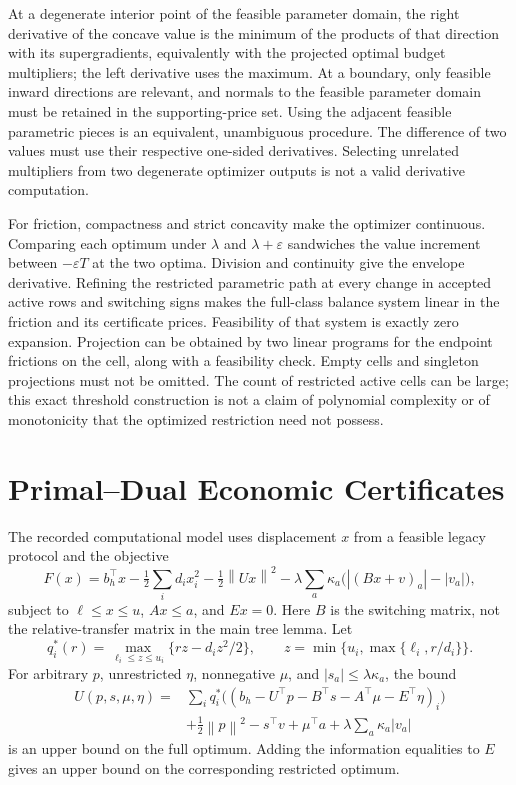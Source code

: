 \documentclass[11pt,letterpaper]{article}
\theoremstyle{definition}\newtheorem{remark}[theorem]{Remark}
\newcommand{\norm}[1]{\left\lVert#1\right\rVert}\newcommand{\argmax}{\operatorname*{arg\,max}}
\begin{document}
At a degenerate interior point of the feasible parameter domain, the right derivative of the concave value is the minimum of the products of that direction with its supergradients, equivalently with the projected optimal budget multipliers; the left derivative uses the maximum. At a boundary, only feasible inward directions are relevant, and normals to the feasible parameter domain must be retained in the supporting-price set. Using the adjacent feasible parametric pieces is an equivalent, unambiguous procedure. The difference of two values must use their respective one-sided derivatives. Selecting unrelated multipliers from two degenerate optimizer outputs is not a valid derivative computation.

For friction, compactness and strict concavity make the optimizer continuous. Comparing each optimum under $\lambda$ and $\lambda+\varepsilon$ sandwiches the value increment between $-\varepsilon T$ at the two optima. Division and continuity give the envelope derivative. Refining the restricted parametric path at every change in accepted active rows and switching signs makes the full-class balance system linear in the friction and its certificate prices. Feasibility of that system is exactly zero expansion. Projection can be obtained by two linear programs for the endpoint frictions on the cell, along with a feasibility check. Empty cells and singleton projections must not be omitted. The count of restricted active cells can be large; this exact threshold construction is not a claim of polynomial complexity or of monotonicity that the optimized restriction need not possess.

\section{Primal--Dual Economic Certificates}\label{ec:dual}
The recorded computational model uses displacement $x$ from a feasible legacy protocol and the objective
\[
 F(x)=b_h^\top x-\tfrac12\sum_i d_i x_i^2-\tfrac12\norm{Ux}^2
 -\lambda\sum_a\kappa_a\bigl(|(Bx+v)_a|-|v_a|\bigr),
\]
subject to $\ell\leq x\leq u$, $Ax\leq a$, and $Ex=0$. Here $B$ is the switching matrix, not the relative-transfer matrix in the main tree lemma. Let
\[
 q_i^*(r)=\max_{\ell_i\leq z\leq u_i}\{rz-d_i z^2/2\},\qquad
 z=\min\{u_i,\max\{\ell_i,r/d_i\}\}.
\]
For arbitrary $p$, unrestricted $\eta$, nonnegative $\mu$, and $|s_a|\leq\lambda\kappa_a$, the bound
\begin{equation}\label{ec:eq:dual}
 \begin{split}
 U(p,s,\mu,\eta)={}&\sum_iq_i^*\bigl((b_h-U^\top p-B^\top s-A^\top\mu-E^\top\eta)_i\bigr)\\
 &+\tfrac12\norm p^2-s^\top v+\mu^\top a
   +\lambda\sum_a\kappa_a|v_a|
 \end{split}
\end{equation}
is an upper bound on the full optimum. Adding the information equalities to $E$ gives an upper bound on the corresponding restricted optimum.
\end{document}
